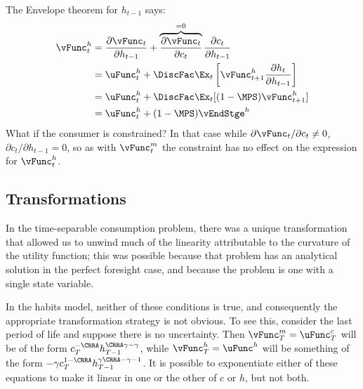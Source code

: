 \documentclass[titlepage, headings=optiontotocandhead]{\econtex}
\begin{document}
{  The Envelope theorem for $h_{t-1}$ says:
  \begin{equation}\begin{gathered}\begin{aligned}
        {\vFunc}_{t}^{h}  & = \frac{\partial {\vFunc}_{t}}{\partial h_{t-1}} + \overbrace{\frac{\partial {\vFunc}_{t}}{\partial {c}_{t}}}^{=0}\frac{\partial {c}_{t}}{\partial h_{t-1}} \nonumber
        \\  & = \uFunc^{h}_{t} + \DiscFac \Ex_{t} \left[{\vFunc}_{t+1}^{h}\frac{\partial h_{t}}{\partial h_{t-1}} \right]\nonumber
        \\  & = \uFunc^{h}_{t} + \DiscFac \Ex_{t} [(1-\MPS) {\vFunc}_{t+1}^{h}] \nonumber
        \\  & = \uFunc^{h}_{t} + (1-\MPS) \vEndStge^{h} \label{eq:vhtformula}
      \end{aligned}\end{gathered}\end{equation}
  What if the consumer is constrained?  In that case while $\partial
  {\vFunc}_{t}/\partial {c}_{t} \neq 0$, $\partial {c}_{t}/\partial h_{t-1} = 0$, so as
  with ${\vFunc}_{t}^{m}$ the constraint has no effect on the expression for ${\vFunc}^{h}_{t}$.

  \hypertarget{Transforamtions}{}
  \subsection{Transformations}

  In the time-separable consumption problem, there was a unique
  transformation that allowed us to unwind much of the linearity
  attributable to the curvature of the utility function; this was
  possible because that problem has an analytical solution in the
  perfect foresight case, and because the problem is one with a single
  state variable.

  In the habits model, neither of these conditions is true, and
  consequently the appropriate transformation strategy is not obvious.
  To see this, consider the last period of life and suppose there is no
  uncertainty.  Then ${\vFunc}_{T}^{m} = \uFunc_{T}^{c}$ will be of the form
  ${c}_{T}^{-\CRRA}h_{T-1}^{\CRRA \gamma - \gamma}$, while ${\vFunc}_{T}^{h} =
  \uFunc^{h}$ will be something of the form $-\gamma
  {c}_{T}^{1-\CRRA}h_{T-1}^{\gamma\CRRA-\gamma-1}$.  It is possible to
  exponentiate either of these equations to make it linear in one or the
  other of ${c}$ or $h$, but not both.

}
\end{document}
